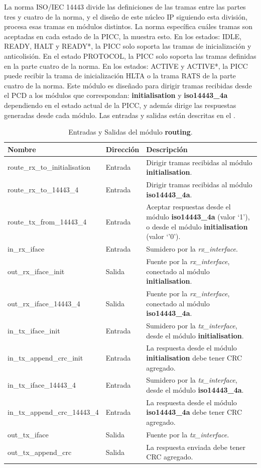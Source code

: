 \documentclass[a4paper, twoside, 11pt]{report}
\begin{document}
La norma ISO/IEC 14443 divide las definiciones de las tramas entre las partes tres y cuatro de la norma, y el diseño de este núcleo IP siguiendo esta división, procesa esas tramas en módulos distintos. La norma específica cuáles tramas son aceptadas en cada estado de la PICC, la  muestra esto. En los estados: IDLE, READY, HALT y READY*, la PICC solo soporta las tramas de inicialización y anticolisión. En el estado PROTOCOL, la PICC solo soporta las tramas definidas en la parte cuatro de la norma. En los estados: ACTIVE y ACTIVE*, la PICC puede recibir la trama de inicialización HLTA o la trama RATS de la parte cuatro de la norma. Este módulo es diseñado para dirigir tramas recibidas desde el PCD a los módulos que correspondan: \textbf{initialisation} y \textbf{iso14443\_4a} dependiendo en el estado actual de la PICC, y además dirige las respuestas generadas desde cada módulo. Las entradas y salidas están descritas en el .

\begin{table}[htb]
  \centering
  \tablezebra
  \begin{tabulary}{\linewidth}{l|l|L}
    \textbf{Nombre}&\textbf{Dirección}&\textbf{Descripción} \\
    \hline
    route\_rx\_to\_initialisation&Entrada&Dirigir tramas recibidas al módulo \textbf{initialisation}. \\
    route\_rx\_to\_14443\_4&Entrada&Dirigir tramas recibidas al módulo \textbf{iso14443\_4a}. \\
    route\_tx\_from\_14443\_4&Entrada&Aceptar respuestas desde el módulo \textbf{iso14443\_4a} (valor ‘1’), o desde el módulo \textbf{initialisation} (valor ‘’0’). \\
    in\_rx\_iface&Entrada&Sumidero por la \textit{rx\_interface}. \\
    out\_rx\_iface\_init&Salida&Fuente por la \textit{rx\_interface}, conectado al módulo \textbf{initialisation}. \\
    out\_rx\_iface\_14443\_4&Salida&Fuente por la \textit{rx\_interface}, conectado al módulo \textbf{iso14443\_4a}. \\
    in\_tx\_iface\_init&Entrada&Sumidero por la \textit{tx\_interface}, desde el módulo \textbf{initialisation}. \\
    in\_tx\_append\_crc\_init&Entrada&La respuesta desde el módulo \textbf{initialisation} debe tener CRC agregado. \\
    in\_tx\_iface\_14443\_4&Entrada&Sumidero por la \textit{tx\_interface}, desde el módulo \textbf{iso14443\_4a}. \\
    in\_tx\_append\_crc\_14443\_4&Entrada&La respuesta desde el módulo \textbf{iso14443\_4a} debe tener CRC agregado. \\
    out\_tx\_iface&Salida&Fuente por la \textit{tx\_interface}. \\
    out\_tx\_append\_crc&Salida&La respuesta enviada debe tener CRC agregado. \\
  \end{tabulary}
  \caption{Entradas y Salidas del módulo \textbf{routing}.}
  \label{tab:ports_routing}
\end{table}
\end{document}
